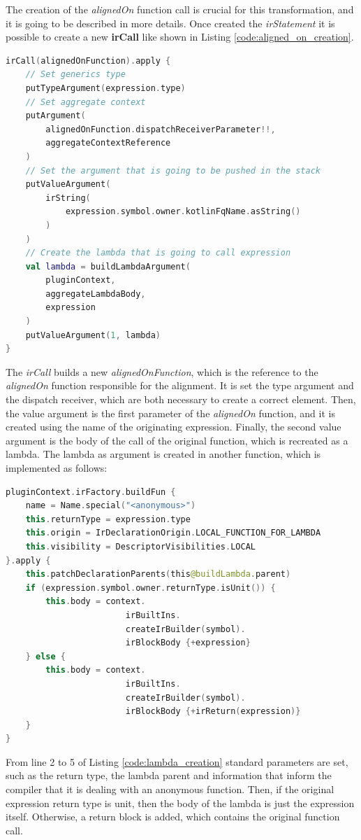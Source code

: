 The creation of the \textit{alignedOn} function call is crucial for this transformation, and it is going to be described in more details. Once created the \textit{irStatement} it is possible to create a new \textbf{irCall} like shown in Listing \ref{code:aligned_on_creation}.
\begin{lstlisting}[caption={Generation goal to handle the alignment of Listing \ref{code:first_alignment_code_example}}, captionpos=b, language=Kotlin, label={code:aligned_on_creation}]
irCall(alignedOnFunction).apply {
    // Set generics type
    putTypeArgument(expression.type)
    // Set aggregate context
    putArgument(
        alignedOnFunction.dispatchReceiverParameter!!,
        aggregateContextReference
    )
    // Set the argument that is going to be pushed in the stack
    putValueArgument(
        irString(
            expression.symbol.owner.kotlinFqName.asString()
        )
    )
    // Create the lambda that is going to call expression
    val lambda = buildLambdaArgument(
        pluginContext,
        aggregateLambdaBody,
        expression
    )
    putValueArgument(1, lambda)
}
\end{lstlisting}
The \textit{irCall} builds a new \textit{alignedOnFunction}, which is the reference to the \textit{alignedOn} function responsible for the alignment. It is set the type argument and the dispatch receiver, which are both necessary to create a correct element. Then, the value argument is the first parameter of the \textit{alignedOn} function, and it is created using the name of the originating expression. Finally, the second value argument is the body of the call of the original function, which is recreated as a lambda.\newline
The lambda as argument is created in another function, which is implemented as follows:
\begin{lstlisting}[caption={Generation goal to handle the alignment of Listing \ref{code:first_alignment_code_example}}, captionpos=b, language=Kotlin, label={code:lambda_creation}]
pluginContext.irFactory.buildFun {
    name = Name.special("<anonymous>")
    this.returnType = expression.type
    this.origin = IrDeclarationOrigin.LOCAL_FUNCTION_FOR_LAMBDA
    this.visibility = DescriptorVisibilities.LOCAL
}.apply {
    this.patchDeclarationParents(this@buildLambda.parent)
    if (expression.symbol.owner.returnType.isUnit()) {
        this.body = context.
                        irBuiltIns.
                        createIrBuilder(symbol).
                        irBlockBody {+expression}
    } else {
        this.body = context.
                        irBuiltIns.
                        createIrBuilder(symbol).
                        irBlockBody {+irReturn(expression)}
    }
}
\end{lstlisting}
From line 2 to 5 of Listing \ref{code:lambda_creation} standard parameters are set, such as the return type, the lambda parent and information that inform the compiler that it is dealing with an anonymous function. Then, if the original expression return type is unit, then the body of the lambda is just the expression itself. Otherwise, a return block is added, which contains the original function call.

